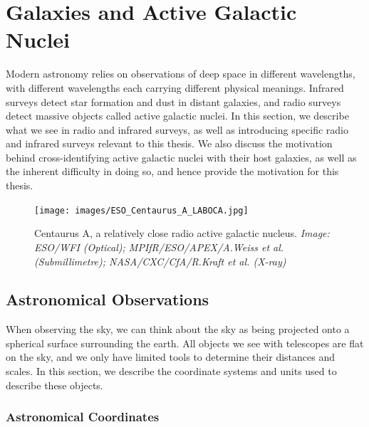 \chapter{Galaxies and Active Galactic Nuclei}
\label{cha:astro}

    Modern astronomy relies on observations of deep space in different
    wavelengths, with different wavelengths each carrying different physical
    meanings. Infrared surveys detect star formation and dust in distant
    galaxies, and radio surveys detect massive objects called active galactic
    nuclei. In this section, we describe what we see in radio and infrared
    surveys, as well as introducing specific radio and infrared surveys relevant
    to this thesis. We also discuss the motivation behind cross-identifying
    active galactic nuclei with their host galaxies, as well as the inherent
    difficulty in doing so, and hence provide the motivation for this thesis.

    \begin{figure}[!ht]
        \centering
        \texttt{[image: images/ESO\_Centaurus\_A\_LABOCA.jpg]}
        \caption{Centaurus A, a relatively close radio active galactic
            nucleus. \emph{Image: ESO/WFI (Optical); MPIfR/ESO/APEX/A.Weiss
            et al. (Submillimetre); NASA/CXC/CfA/R.Kraft et al. (X-ray)}}
        \label{fig:centaurus-a}
    \end{figure}

    \section{Astronomical Observations}
    \label{sec:astronomical-observations}

        When observing the sky, we can think about the sky as being projected
        onto a spherical surface surrounding the earth. All objects we see with
        telescopes are flat on the sky, and we only have limited tools to
        determine their distances and scales. In this section, we describe the
        coordinate systems and units used to describe these objects.

        \subsection{Astronomical Coordinates}
        \label{sec:coordinates}

